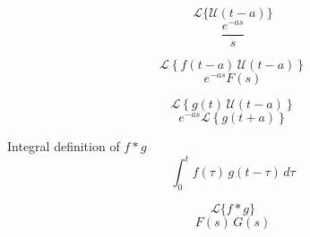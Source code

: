 \documentclass[grid, poker_landscape]{flashcards}
\begin{document}
  \begin{flashcard}{ \[ \mathcal{L} \{ \mathscr{U}(t - a) \} \] }
    \[
      \frac{e^{-as}}{s}
    \]
  \end{flashcard}

  \begin{flashcard}{ \[ \mathcal{L} 
    \left \{ f(t - a) \, \mathscr{U}(t - a) \right \}  \] }
    \[
      e^{-as} F(s)
    \]
  \end{flashcard}

  \begin{flashcard}{ \[ \mathcal{L} 
    \left \{ g(t) \, \mathscr{U}(t - a) \right \} \] }
    \[
      e^{-as} \mathcal{L} \left \{ g(t + a) \right \}
    \]
  \end{flashcard}

  

  \begin{flashcard}{ Integral definition of $ f * g $ }
    \[
      \int_0^t f(\tau) \, g(t - \tau) \, d\tau
    \]
  \end{flashcard}

  \begin{flashcard}{ \[ \mathcal{L} \{ f * g \} \] }
    \[
      F(s) \, G(s)
    \]
  \end{flashcard}






\end{document}
